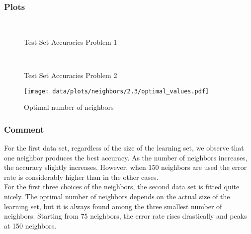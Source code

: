 \documentclass{article}
\begin{document}
\subsubsection{Plots}
		\begin{figure}[H]
		\centering

		 \\


		\caption{\label{acc2.3p1}Test Set Accuracies Problem 1}

	\end{figure}
	\begin{figure}[H]
	\centering
	 \\

	\caption{\label{acc2.3p2}Test Set Accuracies Problem 2}

\end{figure}
\begin{figure}[H]
	\centering
\texttt{[image: data/plots/neighbors/2.3/optimal\_values.pdf]}
	\caption{\label{acc2.3p2}Optimal number of neighbors}

\end{figure}
\subsubsection{Comment}
For the first data set, regardless of the size of the learning set, we observe that one neighbor produces the best accuracy. As the number of neighbors increases, the accuracy slightly increases. However, when 150 neighbors are used the error rate is considerably higher than in the other cases. \\
For the first three choices of the neighbors, the second data set is fitted quite nicely. The optimal number of neighbors depends on the actual size of the learning set, but it is always found among the three smallest number of neighbors. Starting from 75 neighbors, the error rate rises drastically and peaks at 150 neighbors.
\end{document}
